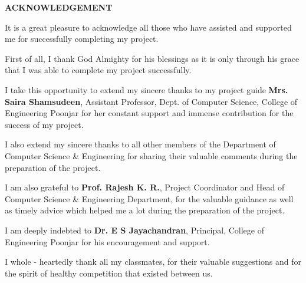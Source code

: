 \documentclass[12pt,a4paper]{report}
\begin{document}
\newpage
{}
\setcounter{page}{1}
\begin{verbatim}
\end{verbatim}
\begin{center}
\textbf {\large ACKNOWLEDGEMENT}
\end{center}
\vspace{0.4125in}
\par
It is a great pleasure to acknowledge all those who have assisted and supported me for successfully completing my project.
\\
\par 
First of all, I thank God Almighty for his blessings as it is only through his grace that I was able to complete my project successfully.
\\
\par 
I take this opportunity to extend my sincere thanks to my project guide \textbf{Mrs. Saira Shamsudeen}, Assistant Professor, Dept. of  Computer Science, College of Engineering Poonjar for her constant support and immense contribution for the success of my project.
\\
\par
I also extend my sincere thanks to all other members of the Department of  Computer Science \& Engineering for sharing their valuable comments  during the preparation of the project.
\\
\par
I am also grateful to \textbf{Prof. Rajesh K. R.}, Project Coordinator and Head of Computer Science \&  Engineering Department, for the valuable guidance as well as timely advice which helped me a lot during the preparation of the project.
\\
\par
I am deeply indebted to \textbf{Dr. E S Jayachandran}, Principal, College of Engineering Poonjar for his encouragement and support.
\\
\par
 I whole - heartedly thank all my classmates, for their valuable suggestions and for the spirit of healthy competition that existed between us.
\newpage
{}
\begin{verbatim}
\end{verbatim}
\end{document}
